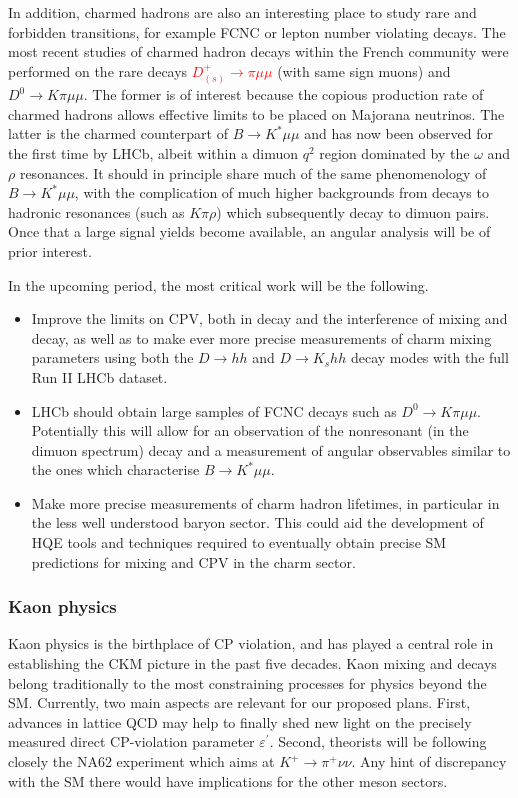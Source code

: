 In addition, charmed hadrons are also an interesting place to study rare and forbidden transitions, for example FCNC or lepton number violating decays. The most recent studies of charmed hadron decays within the French community were performed on the rare decays \textcolor{red}{$D_{(s)}^+ \to \pi \mu\mu$} (with same sign muons) and $D^0 \to K \pi\mu\mu$. The former is of interest because the copious production rate of charmed hadrons allows effective limits to be placed on Majorana neutrinos. The latter is the charmed counterpart of $B\to K^*\mu\mu$ and has now been observed for the first time by LHCb, albeit within a dimuon $q^2$ region dominated by the $\omega$ and $\rho$ resonances. It should in principle share much of the same phenomenology of $B\to K^*\mu\mu$,  with the complication of much higher backgrounds from decays to hadronic resonances (such as $K\pi\rho$) which subsequently decay to dimuon pairs. Once that a large signal yields become available, an angular analysis will be of prior interest. 

In the upcoming period, the most critical work will be the following.
\begin{itemize}
\item Improve the limits on CPV, both in decay and the interference of mixing and decay, as well as to make ever more precise measurements of charm mixing parameters using both the $D\to hh$ and $D\to K_s hh$ decay modes with the full Run II LHCb dataset. \item LHCb should obtain large samples of FCNC decays such as $D^0\to K \pi\mu\mu$.  Potentially this will allow for an observation of the nonresonant (in the dimuon spectrum) decay and a measurement of angular observables similar to the ones which characterise $B\to K^*\mu\mu$. 
\item Make more precise measurements of charm hadron lifetimes, in particular in the less well understood baryon sector. This could aid the development of HQE tools and techniques required to eventually obtain precise SM predictions for mixing and CPV in the charm sector.
\end{itemize}



\subsubsection*{Kaon physics}

  Kaon physics is the birthplace of CP violation, and has played a central
role in establishing the CKM picture in the past five decades. Kaon mixing and decays belong traditionally to the most constraining processes for physics beyond the SM. Currently, two
main aspects are relevant for our proposed plans. First, advances in lattice
QCD may help to finally shed new light on the precisely measured direct
CP-violation parameter $\varepsilon^{\prime}$. Second, theorists will be
following closely the NA62 experiment which aims at $K^{+}\rightarrow\pi
^{+}\nu\nu$. Any hint of discrepancy with the SM there would have implications
for the other meson sectors.



